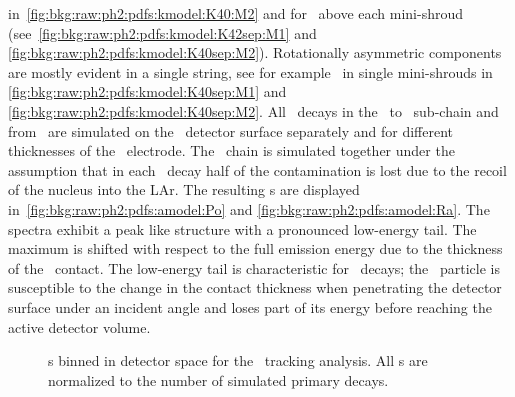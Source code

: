 in~\cref{fig:bkg:raw:ph2:pdfs:kmodel:K40:M2} and for \kvz\ above each mini-shroud
(see~\cref{fig:bkg:raw:ph2:pdfs:kmodel:K42sep:M1} and
\cref{fig:bkg:raw:ph2:pdfs:kmodel:K40sep:M2}). Rotationally asymmetric components are
mostly evident in a single string, see for example \kvn\ in single mini-shrouds in
\cref{fig:bkg:raw:ph2:pdfs:kmodel:K40sep:M1} and
\cref{fig:bkg:raw:ph2:pdfs:kmodel:K40sep:M2}.
\newpar
All \a\ decays in the \Ra\ to \Pbl\ sub-chain and from \Po\ are simulated on the \pplus\
detector surface separately and for different thicknesses of the \pplus\ electrode. The
\Ra\ chain is simulated together under the assumption that in each \a\ decay half of the
contamination is lost due to the recoil of the nucleus into the LAr. The resulting \pdf{}s
are displayed in~\cref{fig:bkg:raw:ph2:pdfs:amodel:Po} and
\cref{fig:bkg:raw:ph2:pdfs:amodel:Ra}. The spectra exhibit a peak like structure with a
pronounced low-energy tail.  The maximum is shifted with respect to the full emission
energy due to the thickness of the \pplus\ contact.  The low-energy tail is characteristic
for \a\ decays; the \a\ particle is susceptible to the change in the contact thickness
when penetrating the detector surface under an incident angle and loses part of its energy
before reaching the active detector volume.

\begin{figure}
  \centering
  \hfill

  \hfill

  \caption{%
    \pdf{}s binned in detector space for the \kvn\ tracking analysis. 
    All \pdf{}s are normalized to the number of simulated primary decays.
  }\label{fig:bkg:raw:ph2:pdfs:kmodel:K40}
\end{figure}

